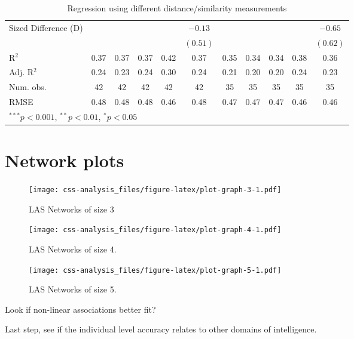 \documentclass[
]{article}
\begin{document}
\begin{landscape}
\begin{table}
\begin{center}
\begin{tabular}{l c c c c c c c c c c }
\quad Sized Difference (D) &             &            &             &              & $-0.13$     &             &             &             &             & $-0.65$     \\
                           &             &            &             &              & $(0.51)$    &             &             &             &             & $(0.62)$    \\
\hline
R$^2$                      & 0.37        & 0.37       & 0.37        & 0.42         & 0.37        & 0.35        & 0.34        & 0.34        & 0.38        & 0.36        \\
Adj. R$^2$                 & 0.24        & 0.23       & 0.24        & 0.30         & 0.24        & 0.21        & 0.20        & 0.20        & 0.24        & 0.23        \\
Num. obs.                  & 42          & 42         & 42          & 42           & 42          & 35          & 35          & 35          & 35          & 35          \\
RMSE                       & 0.48        & 0.48       & 0.48        & 0.46         & 0.48        & 0.47        & 0.47        & 0.47        & 0.46        & 0.46        \\
\hline
\multicolumn{11}{l}{\scriptsize{$^{***}p<0.001$, $^{**}p<0.01$, $^*p<0.05$}}
\end{tabular}
\caption{Regression using different distance/similarity measurements}
\label{table:coefficients}
\end{center}
\end{table}

\end{landscape}

\clearpage

\normalsize

\hypertarget{network-plots}{%
\section{Network plots}\label{network-plots}}

\begin{figure}
\centering
\texttt{[image: css-analysis\_files/figure-latex/plot-graph-3-1.pdf]}
\caption{LAS Networks of size 3}
\end{figure}

\begin{figure}
\centering
\texttt{[image: css-analysis\_files/figure-latex/plot-graph-4-1.pdf]}
\caption{LAS Networks of size 4.}
\end{figure}

\begin{figure}
\centering
\texttt{[image: css-analysis\_files/figure-latex/plot-graph-5-1.pdf]}
\caption{LAS Networks of size 5.}
\end{figure}

Look if non-linear associations better fit?

Last step, see if the individual level accuracy relates to other domains
of intelligence.
\end{document}
